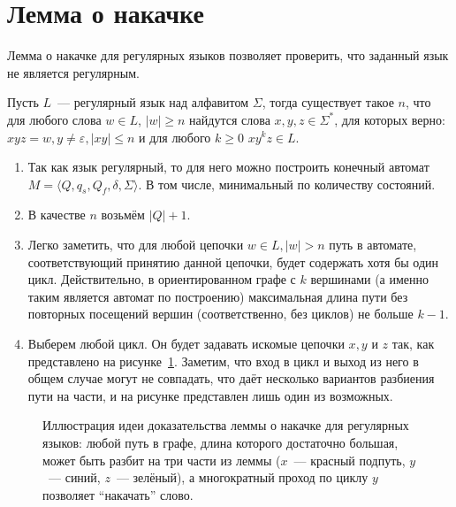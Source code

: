 \section{Лемма о накачке}
\label{sec:RegularPumpingLemma}

Лемма о накачке для регулярных языков позволяет проверить, что заданный язык не является регулярным.

\begin{lemma}
    Пусть $L$~--- регулярный язык над алфавитом $\Sigma$, тогда существует такое $n$, что для любого слова $w \in L$, $|w| \geq n$ найдутся слова $x,y,z\in \Sigma^*$, для которых верно: $xyz = w, y\neq \varepsilon,|xy|\leq n$ и для любого $k \geq 0$ $xy^kz \in L$.
\end{lemma}

\begin{proofSketch}
    \begin{enumerate}
        \item Так как язык регулярный, то для него можно построить конечный автомат $M = \langle Q, q_s,Q_f, \delta, \Sigma \rangle$.
              В том числе, минимальный по количеству состояний.
        \item В качестве $n$ возьмём $|Q| + 1$.
        \item Легко заметить, что для любой цепочки $w \in L, |w| > n$ путь в автомате, соответствующий принятию данной цепочки, будет содержать хотя бы один цикл.
              Действительно, в ориентированном графе с $k$ вершинами (а именно таким является автомат по построению) максимальная длина пути без повторных посещений вершин (соответственно, без циклов) не больше $k - 1$.
        \item Выберем любой цикл. Он будет задавать искомые цепочки $x, y$ и $z$ так, как представлено на рисунке~\ref{fig:reg_lang_pumping_lemma}.
              Заметим, что вход в цикл и выход из него в общем случае могут не совпадать, что даёт несколько вариантов разбиения пути на части, и на рисунке представлен лишь один из возможных.
              \qedhere
    \end{enumerate}
\end{proofSketch}

\begin{figure}
    \caption{Иллюстрация идеи доказательства леммы о накачке для регулярных языков: любой путь в графе, длина которого достаточно большая, может быть разбит на три части из леммы ($x$~--- красный подпуть, $y$~--- синий, $z$~--- зелёный), а многократный проход по циклу $y$ позволяет \enquote{накачать} слово.}
    \label{fig:reg_lang_pumping_lemma}
    \begin{center}
        
    \end{center}

\end{figure}
